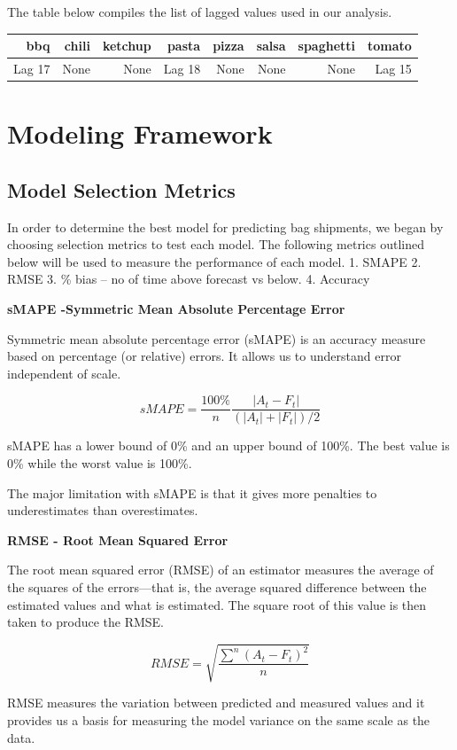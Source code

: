 \documentclass[12pt,oneside]{chicagocapstone}
\begin{document}
The table below compiles the list of lagged values used in our analysis.
\begin{longtable}[]{@{}rrrrrrrr@{}}
\toprule
bbq & chili & ketchup & pasta & pizza & salsa & spaghetti &
tomato\tabularnewline
\midrule
\endhead
Lag 17 & None & None & Lag 18 & None & None & None & Lag
15\tabularnewline
\bottomrule
\end{longtable}
\section*{Modeling Framework}\label{methodology-modeling}

\subsection*{Model Selection
Metrics}\label{methodology-ModelSelectionCriteria}

In order to determine the best model for predicting bag shipments, we
began by choosing selection metrics to test each model. The following
metrics outlined below will be used to measure the performance of each
model. 1. SMAPE 2. RMSE 3. \% bias -- no of time above forecast vs
below. 4. Accuracy

\textbf{sMAPE -Symmetric Mean Absolute Percentage Error}

Symmetric mean absolute percentage error (sMAPE) is an accuracy measure
based on percentage (or relative) errors. It allows us to understand
error independent of scale.

\[sMAPE=\frac{100\%}{n}\frac{|A_t-F_t|}{(|A_t|+|F_t|)/2}\]

sMAPE has a lower bound of 0\% and an upper bound of 100\%. The best
value is 0\% while the worst value is 100\%.

The major limitation with sMAPE is that it gives more penalties to
underestimates than overestimates.

\textbf{RMSE - Root Mean Squared Error}

The root mean squared error (RMSE) of an estimator measures the average
of the squares of the errors---that is, the average squared difference
between the estimated values and what is estimated. The square root of
this value is then taken to produce the RMSE.

\[RMSE = \sqrt{\frac{\sum^n(A_t-F_t)^2}{n}}\]

RMSE measures the variation between predicted and measured values and it
provides us a basis for measuring the model variance on the same scale
as the data.
\end{document}
